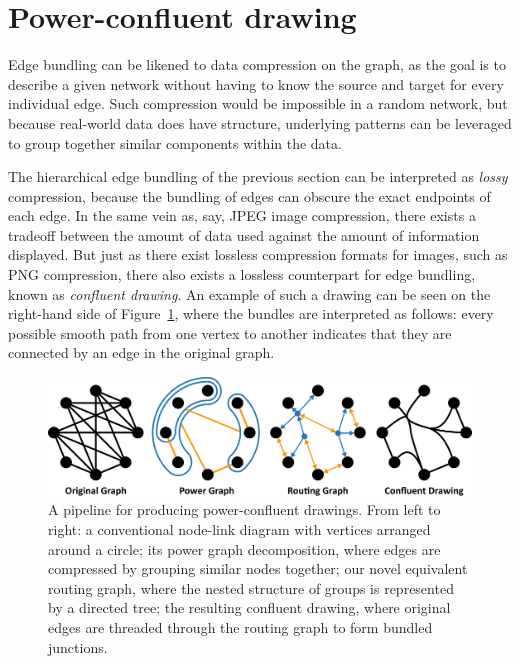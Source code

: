 \section{Power-confluent drawing}
Edge bundling can be likened to data compression on the graph, as the goal is to describe a given network without having to know the source and target for every individual edge. 
Such compression would be impossible in a random network, but because real-world data does have structure, underlying patterns can be leveraged to group together similar components within the data.

The hierarchical edge bundling of the previous section can be interpreted as \emph{lossy} compression, because the bundling of edges can obscure the exact endpoints of each edge. In the same vein as, say, JPEG image compression, there exists a tradeoff between the amount of data used against the amount of information displayed.
But just as there exist lossless compression formats for images, such as PNG compression, there also exists a lossless counterpart for edge bundling, known as \emph{confluent drawing}. An example of such a drawing can be seen on the right-hand side of Figure~\ref{fig:power_teaser}, where the bundles are interpreted as follows: every possible smooth path from one vertex to another indicates that they are connected by an edge in the original graph.

\begin{figure}
    \centering
    \includegraphics[width=\textwidth]{power/teaser.pdf}
    \caption[A power-confluent drawing pipeline]{A pipeline for producing power-confluent drawings. 
    From left to right: a conventional node-link diagram with vertices arranged around a circle; its power graph decomposition, where edges are compressed by grouping similar nodes together; our novel equivalent routing graph, where the nested structure of groups is represented by a directed tree; the resulting confluent drawing, where original edges are threaded through the routing graph to form bundled junctions.}
    \label{fig:power_teaser}
\end{figure}

